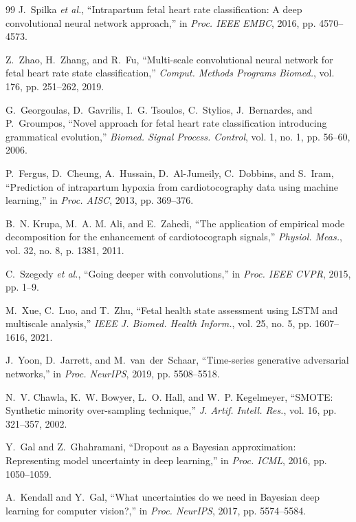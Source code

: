 \documentclass[conference]{IEEEtran}
\begin{document}
\begin{thebibliography}{99}
J.~Spilka \textit{et al.}, ``Intrapartum fetal heart rate classification:
A deep convolutional neural network approach,''
in \textit{Proc. IEEE EMBC}, 2016, pp. 4570--4573.

Z.~Zhao, H.~Zhang, and R.~Fu, ``Multi-scale convolutional neural network for
fetal heart rate state classification,''
\textit{Comput. Methods Programs Biomed.}, vol. 176, pp. 251--262, 2019.

G.~Georgoulas, D.~Gavrilis, I.~G. Tsoulos, C.~Stylios, J.~Bernardes,
and P.~Groumpos, ``Novel approach for fetal heart rate classification
introducing grammatical evolution,''
\textit{Biomed. Signal Process. Control}, vol. 1, no. 1, pp. 56--60, 2006.

P.~Fergus, D.~Cheung, A.~Hussain, D.~Al-Jumeily, C.~Dobbins, and S.~Iram,
``Prediction of intrapartum hypoxia from cardiotocography data using
machine learning,''
in \textit{Proc. AISC}, 2013, pp. 369--376.

B.~N. Krupa, M.~A. M. Ali, and E.~Zahedi,
``The application of empirical mode decomposition for the enhancement of
cardiotocograph signals,''
\textit{Physiol. Meas.}, vol. 32, no. 8, p. 1381, 2011.

C.~Szegedy \textit{et al.}, ``Going deeper with convolutions,''
in \textit{Proc. IEEE CVPR}, 2015, pp. 1--9.

M.~Xue, C.~Luo, and T.~Zhu, ``Fetal health state assessment using LSTM
and multiscale analysis,'' \textit{IEEE J. Biomed. Health Inform.},
vol. 25, no. 5, pp. 1607--1616, 2021.

J.~Yoon, D.~Jarrett, and M.~van~der~Schaar,
``Time-series generative adversarial networks,''
in \textit{Proc. NeurIPS}, 2019, pp. 5508--5518.

N.~V. Chawla, K.~W. Bowyer, L.~O. Hall, and W.~P. Kegelmeyer,
``SMOTE: Synthetic minority over-sampling technique,''
\textit{J. Artif. Intell. Res.}, vol. 16, pp. 321--357, 2002.

Y.~Gal and Z.~Ghahramani, ``Dropout as a Bayesian approximation:
Representing model uncertainty in deep learning,''
in \textit{Proc. ICML}, 2016, pp. 1050--1059.

A.~Kendall and Y.~Gal, ``What uncertainties do we need in Bayesian deep
learning for computer vision?,''
in \textit{Proc. NeurIPS}, 2017, pp. 5574--5584.


\end{thebibliography}
\end{document}
